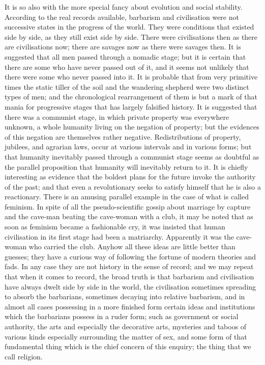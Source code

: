 It is so also with the more special fancy about evolution and social stability. According to the real records available, barbarism and civilisation were not successive states in the progress of the world. They were conditions that existed side by side, as they still exist side by side. There were civilisations then as there are civilisations now; there are savages now as there were savages then. It is suggested that all men passed through a nomadic stage; but it is certain that there are some who have never passed out of it, and it seems not unlikely that there were some who never passed into it. It is probable that from very primitive times the static tiller of the soil and the wandering shepherd were two distinct types of men; and the chronological rearrangement of them is but a mark of that mania for progressive stages that has largely falsified history. It is suggested that there was a communist stage, in which private property was everywhere unknown, a whole humanity living on the negation of property; but the evidences of this negation are themselves rather negative. Redistributions of property, jubilees, and agrarian laws, occur at various intervals and in various forms; but that humanity inevitably passed through a communist stage seems as doubtful as the parallel proposition that humanity will inevitably return to it. It is chiefly interesting as evidence that the boldest plans for the future invoke the authority of the past; and that even a revolutionary seeks to satisfy himself that he is also a reactionary. There is an amusing parallel example in the case of what is called feminism. In spite of all the pseudo-scientific gossip about marriage by capture and the cave-man beating the cave-woman with a club, it may be noted that as soon as feminism became a fashionable cry, it was insisted that human civilisation in its first stage had been a matriarchy. Apparently it was the cave-woman who carried the club. Anyhow all these ideas are little better than guesses; they have a curious way of following the fortune of modern theories and fads. In any case they are not history in the sense of record; and we may repeat that when it comes to record, the broad truth is that barbarism and civilisation have always dwelt side by side in the world, the civilisation sometimes spreading to absorb the barbarians, sometimes decaying into relative barbarism, and in almost all cases possessing in a more finished form certain ideas and institutions which the barbarians possess in a ruder form; such as government or social authority, the arts and especially the decorative arts, mysteries and taboos of various kinds especially surrounding the matter of sex, and some form of that fundamental thing which is the chief concern of this enquiry; the thing that we call religion.

